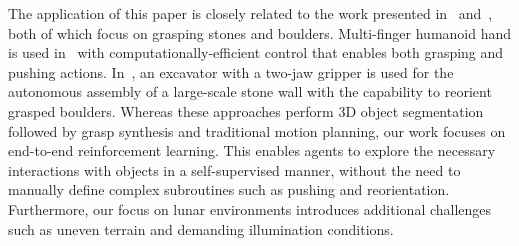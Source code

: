 The application of this paper is closely related to the work presented in~\cite{grimm_vision-based_2021} and~\cite{wermelinger_grasping_2021}, both of which focus on grasping stones and boulders. Multi-finger humanoid hand is used in~\cite{grimm_vision-based_2021} with computationally-efficient control that enables both grasping and pushing actions. In~\cite{wermelinger_grasping_2021}, an excavator with a two-jaw gripper is used for the autonomous assembly of a large-scale stone wall with the capability to reorient grasped boulders. Whereas these approaches perform 3D object segmentation followed by grasp synthesis and traditional motion planning, our work focuses on end-to-end reinforcement learning. This enables agents to explore the necessary interactions with objects in a self-supervised manner, without the need to manually define complex subroutines such as pushing and reorientation. Furthermore, our focus on lunar environments introduces additional challenges such as uneven terrain and demanding illumination conditions.
